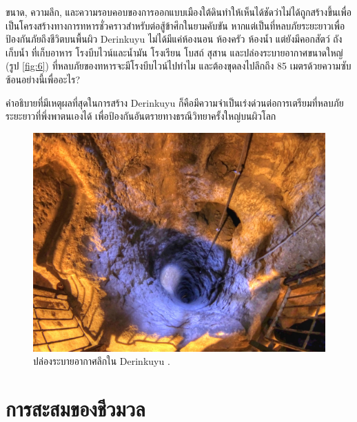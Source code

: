 \documentclass[10pt,twocolumn,letterpaper]{article}
\begin{document}
ขนาด, ความลึก, และความรอบคอบของการออกแบบเมืองใต้ดินทำให้เห็นได้ชัดว่าไม่ได้ถูกสร้างขึ้นเพื่อเป็นโครงสร้างทางการทหารชั่วคราวสำหรับต่อสู้ข้าศึกในยามคับขัน หากแต่เป็นที่หลบภัยระยะยาวเพื่อป้องกันภัยถึงชีวิตบนพื้นผิว Derinkuyu ไม่ได้มีแค่ห้องนอน ห้องครัว ห้องน้ำ แต่ยังมีคอกสัตว์ ถังเก็บน้ำ ที่เก็บอาหาร โรงบีบไวน์และน้ำมัน โรงเรียน โบสถ์ สุสาน และปล่องระบายอากาศขนาดใหญ่ (รูป \ref{fig:6}) ที่หลบภัยของทหารจะมีโรงบีบไวน์ไปทำไม และต้องขุดลงไปลึกถึง 85 เมตรด้วยความซับซ้อนอย่างนี้เพื่ออะไร?

คำอธิบายที่มีเหตุผลที่สุดในการสร้าง Derinkuyu ก็คือมีความจำเป็นเร่งด่วนต่อการเตรียมที่หลบภัยระยะยาวที่พึ่งพาตนเองได้ เพื่อป้องกันอันตรายทางธรณีวิทยาครั้งใหญ่บนผิวโลก

\begin{figure}[t]
\begin{center}
   \includegraphics[width=1\linewidth]{derinkuyu-air.jpg}
\end{center}
   \caption{ปล่องระบายอากาศลึกใน Derinkuyu \cite{53}.}
\label{fig:6}
\label{fig:onecol}
\end{figure}



\section{การสะสมของชีวมวล}
\end{document}
